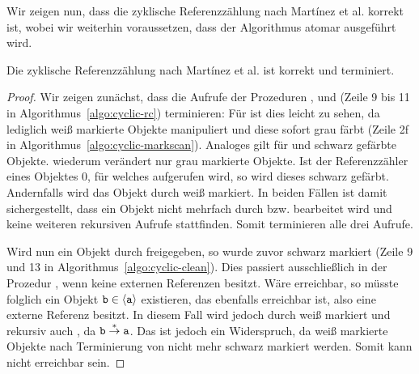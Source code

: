 Wir zeigen nun, dass die zyklische Referenzzählung nach Martínez et al. korrekt ist, wobei wir weiterhin voraussetzen, dass der Algorithmus atomar ausgeführt wird.

\begin{mybox}
\begin{satz}
\label{satz:cyclic-rc-correctness}
	Die zyklische Referenzzählung nach Martínez et al. ist korrekt und terminiert.
\end{satz}
\end{mybox}

\begin{proof}
	Wir zeigen zunächst, dass die Aufrufe der Prozeduren ,  und  (Zeile 9 bis 11 in Algorithmus~\ref{algo:cyclic-rc}) terminieren:
	Für  ist dies leicht zu sehen, da  lediglich weiß markierte Objekte manipuliert und diese sofort grau färbt (Zeile 2f in Algorithmus~\ref{algo:cyclic-markscan}).
	Analoges gilt für  und schwarz gefärbte Objekte.
	 wiederum verändert nur grau markierte Objekte.
	Ist der Referenzzähler eines Objektes $0$, für welches  aufgerufen wird, so wird dieses schwarz gefärbt.
	Andernfalls wird das Objekt durch  weiß markiert.
	In beiden Fällen ist damit sichergestellt, dass ein Objekt nicht mehrfach durch  bzw.  bearbeitet wird und keine weiteren rekursiven Aufrufe stattfinden.
	Somit terminieren alle drei Aufrufe.
	
	Wird nun ein Objekt  durch  freigegeben, so wurde  zuvor schwarz markiert (Zeile 9 und 13 in Algorithmus~\ref{algo:cyclic-clean}).
	Dies passiert ausschließlich in der Prozedur , wenn  keine externen Referenzen besitzt.
	Wäre  erreichbar, so müsste folglich ein Objekt $\texttt{b} \in \left\langle\texttt{a}\right\rangle$ existieren, das ebenfalls erreichbar ist, also eine externe Referenz besitzt.
	In diesem Fall wird  jedoch durch  weiß markiert und rekursiv auch , da $\texttt{b} \overset{*}{\rightarrow} \texttt{a}$.
	Das ist jedoch ein Widerspruch, da weiß markierte Objekte nach Terminierung von  nicht mehr schwarz markiert werden.
	Somit kann  nicht erreichbar sein.
\end{proof}

